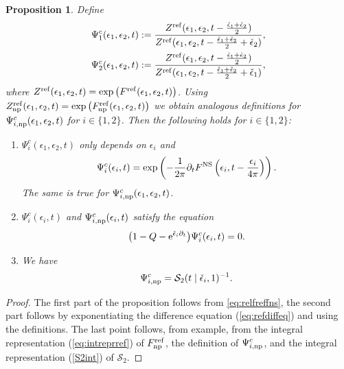 \documentclass[pdftex]{sigma}
\numberwithin{equation}{section}
\newtheorem{Proposition}[Theorem]{Proposition}
 { \theoremstyle{definition}
\newtheorem{Definition}[Theorem]{Definition}
\newtheorem{Note}[Theorem]{Note}
\newtheorem{Example}[Theorem]{Example}
\newtheorem{Remark}[Theorem]{Remark} }
\begin{document}
\begin{Proposition}\label{prop:closedwavefunction}
Define
\begin{gather*}
 \Psi^c_1 (\epsilon_1,\epsilon_2,t) := \frac{Z^{{\rm ref}}(\epsilon_1,\epsilon_2,t- \frac{\check\epsilon_1+\check\epsilon_2}{2})}{Z^{{\rm ref}}(\epsilon_1,\epsilon_2,t- \frac{\check\epsilon_1+\check\epsilon_2}{2}+\check{\epsilon}_2)}, \\
 \Psi^c_{2} (\epsilon_1,\epsilon_2,t) := \frac{Z^{{\rm ref}}(\epsilon_1,\epsilon_2,t- \frac{\check\epsilon_1+\check\epsilon_2}{2})}{Z^{{\rm ref}}(\epsilon_1,\epsilon_2,t- \frac{\check\epsilon_1+\check\epsilon_2}{2}+\check{\epsilon}_1)},
\end{gather*}
where
$ Z^{{\rm ref}}(\epsilon_1,\epsilon_2,t) =\exp\big(F^{{\rm ref}}(\epsilon_1,\epsilon_2,t)\big)$.
Using
$ Z_{{\rm np}}^{{\rm ref}}(\epsilon_1,\epsilon_2,t) =\exp\big(F_{{\rm np}}^{{\rm ref}}(\epsilon_1,\epsilon_2,t)\big)$
we obtain analogous definitions for $\Psi^c_{i,{\rm np}} (\epsilon_1,\epsilon_2,t)$ for $i\in \{1,2\}$.
Then the following holds for $i\in \{1,2\}$:
\begin{enumerate}\itemsep=0pt
\item[$1.$] $\Psi^c_{i} (\epsilon_1,\epsilon_2,t)$ only depends on $\epsilon_i$ and
\begin{equation*}
 \Psi^c_{i} (\epsilon_i,t)= \exp\left( -\frac{1}{2\pi} \partial_t F^{\rm NS} \left(\epsilon_i,t-\frac{\epsilon_i}{4\pi}\right) \right). \end{equation*}
The same is true for $\Psi^c_{i,{\rm np}} (\epsilon_1,\epsilon_2,t)$.
\item[$2.$] $\Psi^c_{i} (\epsilon_i,t)$ and $\Psi^c_{i,{\rm np}} (\epsilon_i,t) $ satisfy the equation
\begin{equation*}%
 \big(1-Q- {\rm e}^{\check{\epsilon}_i \partial_t} \big) \Psi^c_{i} (\epsilon_i,t)=0.
\end{equation*}
\item[$3.$] We have
\begin{equation*}
 \Psi^{c}_{i,{\rm np}}=\mathcal{S}_2(t\mid \check\epsilon_i,1)^{-1}.
\end{equation*}
\end{enumerate}
\end{Proposition}

\begin{proof}
The first part of the proposition follows from \eqref{eq:relfreffns}, the second part follows by exponentiating the difference equation (\ref{eq:refdiffeq}) and using the definitions. The last point follows, from example, from the integral representation (\ref{eq:intreprref}) of $F_{{\rm np}}^{\rm ref}$, the definition of $\Psi_{i,{\rm np}}^c$, and the integral representation (\ref{S2int}) of $\mathcal{S}_2$.
\end{proof}
\end{document}
